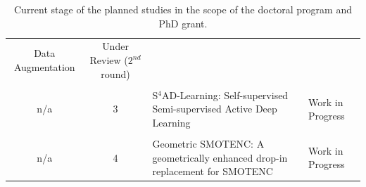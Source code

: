 \begin{table}[ht]
\begin{tabular}{ccm{}m{}}
                                                   Data Augmentation                   & Under Review 
                                                                                       ($2^{nd}$ round)   \\
        \vspace{-.2cm}\\
        n/a & 3     & S$^4$AD-Learning: Self-supervised Semi-supervised Active Deep 
                  Learning                                                          & Work in Progress    \\
        \vspace{-.2cm}\\
        n/a & 4     & Geometric SMOTENC\@: A geometrically enhanced drop-in 
                  replacement for SMOTENC                                           & Work in Progress    \\
        \bottomrule
    \end{tabular}
    \caption{\label{tab:studies}
        Current stage of the planned studies in the scope of the doctoral
        program and PhD grant.
    }
\end{table}
